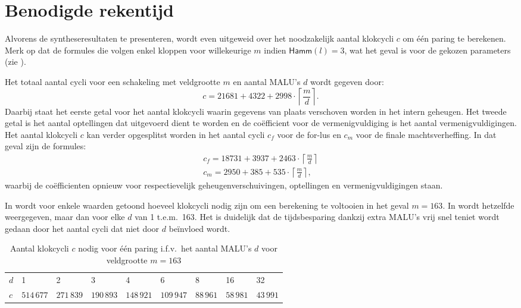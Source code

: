 \section{Benodigde rekentijd}

Alvorens de syntheseresultaten te presenteren, wordt even uitgeweid over het noodzakelijk aantal klokcycli $c$ om \'e\'en paring te berekenen. Merk op dat de formules die volgen enkel kloppen voor willekeurige $m$ indien $\textsf{Hamm}(l) = 3$, wat het geval is voor de gekozen parameters (zie ).

Het totaal aantal cycli voor een schakeling met veldgrootte $m$ en aantal MALU's $d$ wordt gegeven door:
\[c = 21681 + 4322 + 2998 \cdot \left\lceil \frac{m}{d} \right\rceil.\]
Daarbij staat het eerste getal voor het aantal klokcycli waarin gegevens van plaats verschoven worden in het intern geheugen. Het tweede getal is het aantal optellingen dat uitgevoerd dient te worden en de co\"efficient voor de vermenigvuldiging is het aantal vermenigvuldigingen. Het aantal klokcycli $c$ kan verder opgesplitst worden in het aantal cycli $c_f$ voor de for-lus en $c_m$ voor de finale machtsverheffing. In dat geval zijn de formules:
\[\begin{gathered}
c_f = 18731 + 3937 + 2463 \cdot \left\lceil \frac{m}{d} \right\rceil\\
c_m = 2950 + 385 + 535 \cdot \left\lceil \frac{m}{d} \right\rceil,
\end{gathered}\]
waarbij de co\"efficienten opnieuw voor respectievelijk geheugenverschuivingen, optellingen en vermenigvuldigingen staan.

In  wordt voor enkele waarden getoond hoeveel klokcycli nodig zijn om een berekening te voltooien in het geval $m = 163$. In  wordt hetzelfde weergegeven, maar dan voor elke $d$ van 1 t.e.m.\ 163. Het is duidelijk dat de tijdsbesparing dankzij extra MALU's vrij snel teniet wordt gedaan door het aantal cycli dat niet door $d$ be\"invloed wordt.

\begin{table}[h]
	\caption{Aantal klokcycli $c$ nodig voor \'e\'en paring i.f.v.\ het aantal MALU's $d$ voor veldgrootte $m = 163$}
	\label{tabel-resultaten-multi-cycles}

	\begin{narrow}{-1cm}{-1cm}
		\centering
		\begin{tabular}{lllllllll}
			\toprule
			$d$	& 1	& 2	& 3	& 4	& 6	& 8	& 16	& 32\\
			$c$	& $514\,677$	& $271\,839$	& $190\,893$	& $148\,921$	& $109\,947$	& $88\,961$	& $58\,981$	& $43\,991$\\
			\bottomrule	
		\end{tabular}
	\end{narrow}
\end{table}

